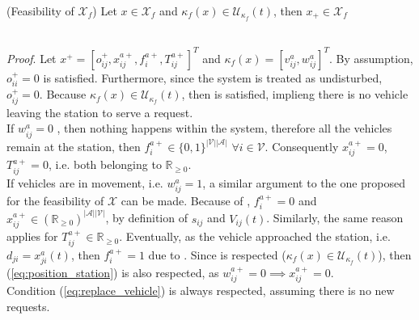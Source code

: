 \begin{proposition}{(Feasibility of $\mathcal{X}_f$)}\label{pro:feas_xf}
	Let $x \in \mathcal{X}_f$ and $\kappa_f(x) \in \mathcal{U}_{\kappa_f}(t)$, then $x_+\in \mathcal{X}_f$
\end{proposition}\\

\textit{Proof}. Let $x^+ = [o_{ij}^+, x_{ij}^{a+}, f^{a+}_{i}, T_{ij}^{a+}]^T$ and $\kappa_f(x) = [v^{a}_{ij}, w^{a}_{ij}]^T$. By assumption, $o_{ii}^+ = 0$ is satisfied. Furthermore, since the system is treated as undisturbed, $o_{ij}^+ = 0$. Because $\kappa_f(x) \in \mathcal{U}_{\kappa_f}(t)$, then  is satisfied, implieng there is no vehicle leaving the station to serve a request. \\
If $w^a_{ij} = 0$ , then nothing happens within the system, therefore all the vehicles remain at the station, then $ f^{a+}_{i} \in \{0,1\}^{|\mathcal{V}||\mathcal{A}|}$ $\forall i \in \mathcal{V}$. Consequently   $x_{ij}^{a+} = 0$, $T_{ij}^{a+}=0$, i.e. both belonging to $\mathbb{R}_{\ge 0}$.\\
If vehicles are in movement, i.e. $w^a_{ij} = 1$, a similar argument to the one proposed for the feasibility of $\mathcal{X}$ can be made. Because of , $f^{a+}_{i}=0$ and $x_{ij}^{a+}\in (\mathbb{R}_{\ge 0})^{|\mathcal{A}||\mathcal{V}|}$, by definition of $s_{ij}$ and $V_{ij}(t)$. Similarly, the same reason applies for $T_{ij}^{a+} \in \mathbb{R}_{\ge0}$. Eventually, as the vehicle approached the station, i.e. $d_{ji} = x^a_{ji}(t)$, then $f^{a+}_{i}=1$ due to . Since 
 is respected ($\kappa_f(x) \in \mathcal{U}_{\kappa_f}(t)$), then  (\ref{eq:position_station}) is also respected, as $ w^{a+}_{ij}=0 \implies x_{ij}^{a+}=0$. \\
Condition (\ref{eq:replace_vehicle}) is always respected, assuming there is no new requests. \\




